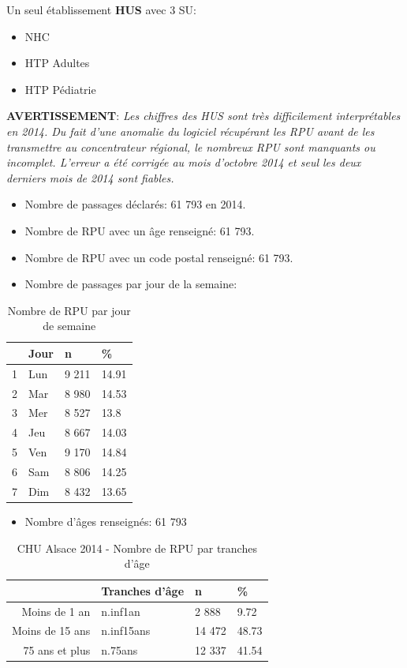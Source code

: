 \documentclass[]{article}
\begin{document}
Un seul établissement \textbf{HUS} avec 3 SU:

\begin{itemize}
\itemsep1pt\parskip0pt
\item
  NHC
\item
  HTP Adultes
\item
  HTP Pédiatrie
\end{itemize}

\textbf{AVERTISSEMENT}: \emph{Les chiffres des HUS sont très
difficilement interprétables en 2014. Du fait d'une anomalie du logiciel
récupérant les RPU avant de les transmettre au concentrateur régional,
le nombreux RPU sont manquants ou incomplet. L'erreur a été corrigée au
mois d'octobre 2014 et seul les deux derniers mois de 2014 sont
fiables.}

\begin{itemize}
\itemsep1pt\parskip0pt
\item
  Nombre de passages déclarés: 61 793 en 2014.
\item
  Nombre de RPU avec un âge renseigné: 61 793.
\item
  Nombre de RPU avec un code postal renseigné: 61 793.
\item
  Nombre de passages par jour de la semaine:
\end{itemize}

\begin{table}[ht]
\centering
\begin{tabular}{rlll}
  \hline
 & Jour & n & \% \\ 
  \hline
1 & Lun & 9 211 & 14.91 \\ 
  2 & Mar & 8 980 & 14.53 \\ 
  3 & Mer & 8 527 & 13.8 \\ 
  4 & Jeu & 8 667 & 14.03 \\ 
  5 & Ven & 9 170 & 14.84 \\ 
  6 & Sam & 8 806 & 14.25 \\ 
  7 & Dim & 8 432 & 13.65 \\ 
   \hline
\end{tabular}
\caption{Nombre de RPU par jour de semaine} 
\end{table}

\begin{itemize}
\itemsep1pt\parskip0pt
\item
  Nombre d'âges renseignés: 61 793
\end{itemize}

\begin{table}[ht]
\centering
\begin{tabular}{rlll}
  \hline
 & Tranches d'âge & n & \% \\ 
  \hline
Moins de 1 an & n.inf1an &  2 888 & 9.72 \\ 
  Moins de 15 ans & n.inf15ans & 14 472 & 48.73 \\ 
  75 ans et plus & n.75ans & 12 337 & 41.54 \\ 
   \hline
\end{tabular}
\caption{CHU Alsace 2014 - Nombre de RPU par tranches d'âge} 
\end{table}
\end{document}
